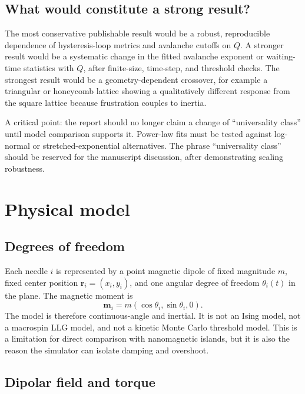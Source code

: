 \documentclass[11pt,a4paper]{article}
\newcommand{\vect}[1]{\boldsymbol{#1}}
\begin{document}
\subsection{What would constitute a strong result?}

The most conservative publishable result would be a robust, reproducible dependence of hysteresis-loop metrics and avalanche cutoffs on $Q$. A stronger result would be a systematic change in the fitted avalanche exponent or waiting-time statistics with $Q$, after finite-size, time-step, and threshold checks. The strongest result would be a geometry-dependent crossover, for example a triangular or honeycomb lattice showing a qualitatively different response from the square lattice because frustration couples to inertia.

A critical point: the report should no longer claim a change of ``universality class'' until model comparison supports it. Power-law fits must be tested against log-normal or stretched-exponential alternatives. The phrase ``universality class'' should be reserved for the manuscript discussion, after demonstrating scaling robustness.

\section{Physical model}
\label{sec:model}

\subsection{Degrees of freedom}

Each needle $i$ is represented by a point magnetic dipole of fixed magnitude $m$, fixed center position $\vect r_i=(x_i,y_i)$, and one angular degree of freedom $\theta_i(t)$ in the plane. The magnetic moment is
\begin{equation}
\vect m_i = m(\cos\theta_i,\sin\theta_i,0).
\end{equation}
The model is therefore continuous-angle and inertial. It is not an Ising model, not a macrospin LLG model, and not a kinetic Monte Carlo threshold model. This is a limitation for direct comparison with nanomagnetic islands, but it is also the reason the simulator can isolate damping and overshoot.

\subsection{Dipolar field and torque}
\end{document}
